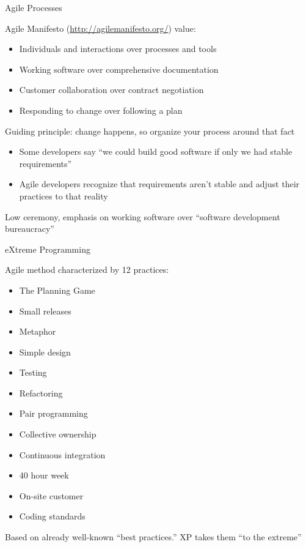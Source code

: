 \documentclass{beamer}
\author[Chris Simpkins] 
{Christopher Simpkins \\\texttt{chris.simpkins@gatech.edu}}
\institute[Georgia Tech] %
\date[CS 1331]{}
\begin{document}
\begin{frame}
  \titlepage
\end{frame}


\begin{frame}[fragile]{Agile Processes}


Agile Manifesto (\url{http://agilemanifesto.org/}) value:
\begin{itemize}
\item {\large Individuals and interactions} over processes and tools
\item {\large Working software} over comprehensive documentation
\item {\large Customer collaboration} over contract negotiation
\item {\large Responding to change} over following a plan
\end{itemize}
Guiding principle: change happens, so organize your process around that fact
\begin{itemize}
\item Some developers say ``we could build good software if only we had stable requirements''
\item Agile developers recognize that requirements aren't stable and adjust their practices to that reality
\end{itemize}
Low ceremony, emphasis on working software over ``software development bureaucracy''

\end{frame}

\begin{frame}[fragile]{eXtreme Programming}


Agile method characterized by 12 practices:
\begin{itemize}
\item The Planning Game
\item Small releases
\item Metaphor
\item Simple design
\item Testing
\item Refactoring
\item Pair programming
\item Collective ownership
\item Continuous integration
\item 40 hour week
\item On-site customer
\item Coding standards
\end{itemize}
Based on already well-known ``best practices.''  XP takes them ``to the extreme''

\end{frame}
\end{document}
